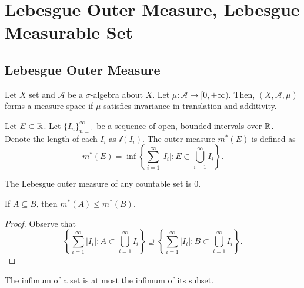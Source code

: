 \documentclass[class=book, crop=false]{standalone}
\begin{document}
    \section{Lebesgue Outer Measure, Lebesgue Measurable Set}
        \subsection{Lebesgue Outer Measure}
        \begin{definition}
            Let $X$ set and $\mathcal{A}$ be a $\sigma$-algebra about $X$. Let $\mu : \mathcal{A} \rightarrow [0, +\infty)$. Then, $(X, \mathcal{A}, \mu)$ forms a measure space if $\mu$ satisfies invariance in translation and additivity.
        \end{definition}

        \begin{definition}
            Let $E \subset \mathbb{R}$. Let $\{I_n\}^{\infty}_{n = 1}$ be a sequence of open, bounded intervals over $\mathbb{R}$. Denote the length of each $I_i$ as $\mathscr{l}(I_i)$. The outer measure $m^*(E)$ is defined as
            \begin{equation*}
                m^*(E) = \inf\left\{\sum^{\infty}_{i = 1} |I_i| : E \subset \bigcup^{\infty}_{i = 1} I_i\right\}.
            \end{equation*}
        \end{definition}

        \begin{theorem}
            The Lebesgue outer measure of any countable set is $0$.
        \end{theorem}

        \begin{theorem}[Monotonicity]
            If $A \subseteq B$, then $m^*(A) \leq m^*(B)$.
        \end{theorem}
        \begin{proof}
            Observe that
            \begin{equation*}
                \left\{\sum^{\infty}_{i = 1} |I_i| : A \subset \bigcup^{\infty}_{i = 1} I_i\right\} \supseteq \left\{\sum^{\infty}_{i = 1} |I_i| : B \subset \bigcup^{\infty}_{i = 1} I_i\right\}.
            \end{equation*}
        \end{proof}
        \begin{remark}
            The infimum of a set is at most the infimum of its subset.
        \end{remark}
\end{document}
